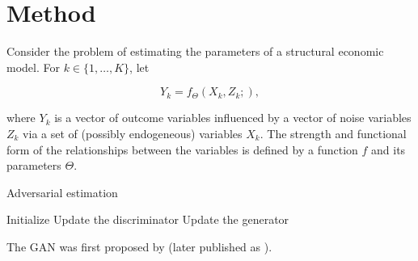 \section{Method}
\label{sec:method}

Consider the problem of estimating the parameters of a structural economic model.
For $k \in \{1,\dots,K\}$, let

\begin{equation}
    Y_k = f_{\Theta}(X_k, Z_k; ),
\end{equation}

where $Y_k$ is a vector of outcome variables influenced by a vector of noise variables $Z_k$ via a set of (possibly endogeneous) variables $X_k$.
The strength and functional form of the relationships between the variables is defined by a function $f$ and its parameters $\Theta$.

\begin{algorithm}
    \caption{Adversarial estimation}
    \label{alg:adversarial_estimation}
    \begin{algorithmic}
        \STATE Initialize
            \STATE Update the discriminator
            \STATE Update the generator
        \ENDFOR
    \end{algorithmic}
\end{algorithm}

The GAN was first proposed by \textcite{goodfellow2014generative} (later published as \textcite{goodfellow2020generative}).